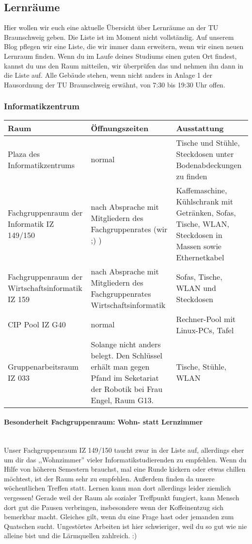 
\subsection{Lernräume}
	Hier wollen wir euch eine aktuelle Übersicht über Lernräume an der TU Braunschweig geben. Die Liste ist im Moment nicht vollständig. Auf unserem Blog pflegen wir eine Liste, die wir immer dann erweitern, wenn wir einen neuen Lernraum finden.
Wenn du im Laufe deines Studiums einen guten Ort findest, kannst du uns den Raum mitteilen, wir überprüfen das und nehmen ihn dann in die Liste auf. Alle Gebäude stehen, wenn nicht anders in Anlage 1 der Hausordnung der TU Braunschweig erwähnt, von 7:30 bis 19:30 Uhr offen.
	\subsubsection*{Informatikzentrum}
		\begin{tabular}{|p{4cm}|p{5cm}|p{8cm}|}
			\hline Raum & Öffnungszeiten & Ausstattung \\ 
			\hline Plaza des Informatikzentrums & normal &  Tische und Stühle, Steckdosen unter Bodenabdeckungen zu finden \\
			\hline Fachgruppenraum der Informatik IZ 149/150 &
			nach Absprache mit Mitgliedern des
			Fachgruppenrates (wir ;) ) & Kaffemaschine,
			Kühlschrank mit Getränken, 
			Sofas, Tische, WLAN, Steckdosen in Massen sowie Ethernetkabel\\ 
			\hline Fachgruppenraum der Wirtschaftsinformatik
			IZ 159 & nach Absprache mit Mitgliedern des
			Fachgruppenrates Wirtschaftsinformatik & Sofas, Tische, WLAN und Steckdosen \\ 
			\hline CIP Pool IZ G40 & normal & Rechner-Pool mit Linux-PCs, Tafel\\ 
			\hline Gruppenarbeitsraum IZ 033 & 
			
			Solange nicht anders belegt. Den Schlüssel
			erhält man gegen Pfand im Seketariat der Robotik bei Frau Engel,
			Raum G13.
			 &
			Tische, Stühle, WLAN
			\\
			\hline
		\end{tabular}
	\paragraph{Besonderheit Fachgruppenraum: Wohn- statt
	Lernzimmer}\ \\
	Unser Fachgruppenraum IZ 149/150 taucht zwar in der Liste auf,
	allerdings eher um dir das  ,,Wohnzimmer'' vieler
	Informatikstudierenden  zu empfehlen. Wenn du  Hilfe von höheren
	Semestern brauchst, mal eine
	Runde kickern oder etwas chillen möchtest, ist der Raum
	sehr zu empfehlen. Außerdem finden da unsere wöchentlichen
	Treffen statt. Lernen kann man dort allerdings leider ziemlich
	vergessen! Gerade weil der Raum als sozialer Treffpunkt
	fungiert, kann Mensch dort gut die Pausen verbringen,
	insbesondere wenn der Koffeinentzug sich bemerkbar macht.
	Gleiches gilt, wenn du eine Frage hast oder jemanden zum
	Quatschen sucht. Ungestörtes Arbeiten ist hier
	schwieriger, weil du so gut wie nie alleine bist und die
	Lärmquellen zahlreich. :)
